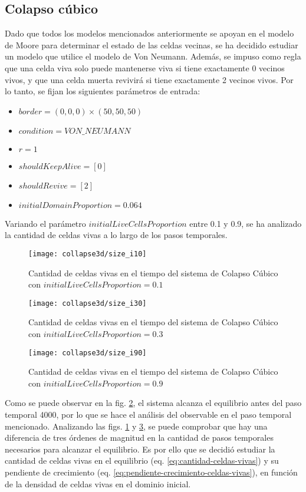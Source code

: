 \subsection{Colapso cúbico}\label{subsec:colapso-cubico}
Dado que todos los modelos mencionados anteriormente se apoyan en el modelo de Moore para determinar el estado
de las celdas vecinas, se ha decidido estudiar un modelo que utilice el modelo de Von Neumann.
Además, se impuso como regla que una celda viva solo puede mantenerse viva si tiene exactamente 0 vecinos vivos,
y que una celda muerta revivirá si tiene exactamente 2 vecinos vivos.
Por lo tanto, se fijan los siguientes parámetros de entrada:
\begin{itemize}
    \item $border = (0, 0, 0) \times (50, 50, 50)$
    \item $condition = VON\_NEUMANN$
    \item $r = 1$
    \item $shouldKeepAlive = [0]$
    \item $shouldRevive = [2]$
    \item $initialDomainProportion = 0.064$
\end{itemize}

Variando el parámetro $initialLiveCellsProportion$ entre 0.1 y 0.9, se ha analizado la cantidad de celdas vivas
a lo largo de los pasos temporales.

\begin{figure}[H]
    \centering
    \texttt{[image: collapse3d/size\_i10]}
    \caption{Cantidad de celdas vivas en el tiempo del sistema de Colapso Cúbico con $initialLiveCellsProportion = 0.1$}
    \label{fig:colapso3d_i10}
\end{figure}
\begin{figure}[H]
    \centering
    \texttt{[image: collapse3d/size\_i30]}
    \caption{Cantidad de celdas vivas en el tiempo del sistema de Colapso Cúbico con $initialLiveCellsProportion = 0.3$}
    \label{fig:colapso3d_i30}
\end{figure}
\begin{figure}[H]
    \centering
    \texttt{[image: collapse3d/size\_i90]}
    \caption{Cantidad de celdas vivas en el tiempo del sistema de Colapso Cúbico con $initialLiveCellsProportion = 0.9$}
    \label{fig:colapso3d_i90}
\end{figure}

Como se puede observar en la fig. \ref{fig:colapso3d_i30}, el sistema alcanza el equilibrio
antes del paso temporal 4000, por lo que se hace el análisis del observable en el paso temporal mencionado.
Analizando las figs. \ref{fig:colapso3d_i10} y \ref{fig:colapso3d_i90}, se
puede comprobar que hay una diferencia de tres órdenes de magnitud en la cantidad de pasos temporales necesarios para
alcanzar el equilibrio.
Es por ello que se decidió estudiar la cantidad de celdas vivas en el equilibrio (eq. \ref{eq:cantidad-celdas-vivas})
y su pendiente de crecimiento (eq. \ref{eq:pendiente-crecimiento-celdas-vivas}),
en función de la densidad de celdas vivas en el dominio inicial.

